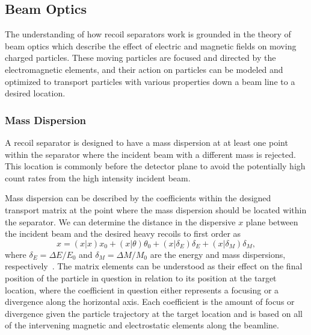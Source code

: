 \subsection{Beam Optics}

The understanding of how recoil separators work is grounded in the
theory of beam optics which describe the effect of electric and magnetic
fields on moving charged particles. These moving particles are focused
and directed by the electromagnetic elements, and their action on
particles can be modeled and optimized to transport particles with
various properties down a beam line to a desired location.

\subsubsection{Mass Dispersion}
A recoil separator is designed to have a mass dispersion at at least one
point within the separator where the incident beam with a different mass
is rejected. This location is commonly before the detector plane to
avoid the potentially high count rates from the high intensity incident
beam.

Mass dispersion can be described by the coefficients within the designed
transport matrix at the point where the mass dispersion should be
located within the separator. We can determine the distance in the
dispersive $x$ plane between the incident beam and the desired heavy
recoils to first order as
\[
    x = (x|x)x_0 + (x|\theta)\theta_0 + (x|\delta_E)\delta_E + (x|\delta_M)\delta_M,
\]
where $\delta_E = \Delta E/E_0$ and $\delta_M = \Delta M/M_0$ are the
energy and mass dispersions, respectively~\cite{Davids2003}. The matrix
elements can be understood as their effect on the final position of the
particle in question in relation to its position at the target location,
where the coefficient in question either represents a focusing or a
divergence along the horizontal axis. Each coefficient is the amount of
focus or divergence given the particle trajectory at the target location
and is based on all of the intervening magnetic and electrostatic
elements along the beamline.

